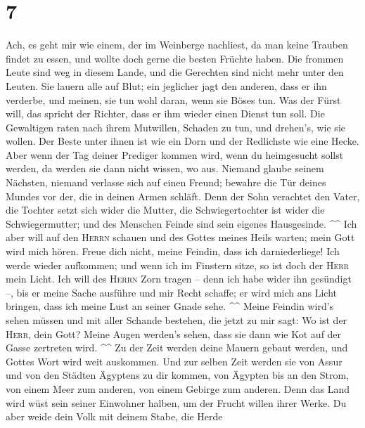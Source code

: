 \hypertarget{section-3}{%
\section{7}\label{section-3}}

 Ach, es geht mir wie einem, der im Weinberge nachliest,
da man keine Trauben findet zu essen, und wollte doch gerne die besten
Früchte haben.  Die frommen Leute sind weg in diesem
Lande, und die Gerechten sind nicht mehr unter den Leuten. Sie lauern
alle auf Blut; ein jeglicher jagt den anderen, dass er ihn verderbe,
 und meinen, sie tun wohl daran, wenn sie Böses tun. Was
der Fürst will, das spricht der Richter, dass er ihm wieder einen Dienst
tun soll. Die Gewaltigen raten nach ihrem Mutwillen, Schaden zu tun, und
drehen's, wie sie wollen.  Der Beste unter ihnen ist wie
ein Dorn und der Redlichste wie eine Hecke. Aber wenn der Tag deiner
Prediger kommen wird, wenn du heimgesucht sollst werden, da werden sie
dann nicht wissen, wo aus.  Niemand glaube seinem
Nächsten, niemand verlasse sich auf einen Freund; bewahre die Tür deines
Mundes vor der, die in deinen Armen schläft.  Denn der
Sohn verachtet den Vater, die Tochter setzt sich wider die Mutter, die
Schwiegertochter ist wider die Schwiegermutter; und des Menschen Feinde
sind sein eigenes Hausgesinde. \^{}\^{}  Ich aber will auf
den \textsc{Herrn} schauen und des Gottes meines Heils warten; mein Gott
wird mich hören.  Freue dich nicht, meine Feindin, dass
ich darniederliege! Ich werde wieder aufkommen; und wenn ich im Finstern
sitze, so ist doch der \textsc{Herr} mein Licht.  Ich will
des \textsc{Herrn} Zorn tragen -- denn ich habe wider ihn gesündigt --,
bis er meine Sache ausführe und mir Recht schaffe; er wird mich ans
Licht bringen, dass ich meine Lust an seiner Gnade sehe. \^{}\^{}
 Meine Feindin wird's sehen müssen und mit aller Schande
bestehen, die jetzt zu mir sagt: Wo ist der \textsc{Herr}, dein Gott?
Meine Augen werden's sehen, dass sie dann wie Kot auf der Gasse
zertreten wird. \^{}\^{}  Zu der Zeit werden deine Mauern
gebaut werden, und Gottes Wort wird weit auskommen.  Und
zur selben Zeit werden sie von Assur und von den Städten Ägyptens zu dir
kommen, von Ägypten bis an den Strom, von einem Meer zum anderen, von
einem Gebirge zum anderen.  Denn das Land wird wüst sein
seiner Einwohner halben, um der Frucht willen ihrer Werke.
 Du aber weide dein Volk mit deinem Stabe, die Herde
